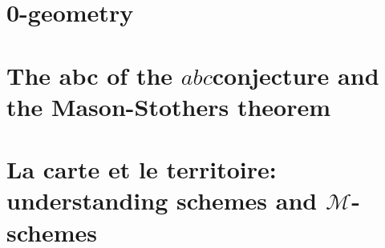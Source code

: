 \documentclass[a4paper]{memoir}
\begin{document}
\chapter{0-geometry}
\label{chapter:prep-notes}






\chapter{The abc of the \texorpdfstring{$abc$}-conjecture and the Mason-Stothers theorem}





\chapter{La carte et le territoire: understanding schemes and \texorpdfstring{$\mathcal{M}$}{M}-schemes}






%
%
%
%
%
%
%
%
%
%
%
%
%
\end{document}
